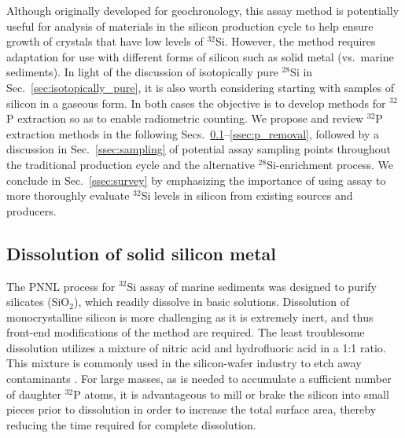 \documentclass[final,5p]{elsarticle}
\def\si{$^{32}$Si\xspace}
\def\p{$^{32}$P\xspace}
\def\esi{$^{28}$Si\xspace}
\begin{document}
Although originally developed for geochronology, this assay method is potentially useful for analysis of materials in the silicon production cycle to help ensure growth of crystals that have low levels of \si. However, the method requires adaptation for use with different forms of silicon such as solid metal (vs.\ marine sediments). In light of the discussion of isotopically pure \esi in Sec.\ \ref{sec:isotopically_pure}, it is also worth considering starting with samples of silicon in a gaseous form. In both cases the objective is to develop methods for \p extraction so as to enable radiometric counting. We propose and review \p extraction methods in the following Secs.\ \ref{ssec:solid}--\ref{ssec:p_removal}, followed by a discussion in Sec.\ \ref{ssec:sampling} of potential assay sampling points throughout the traditional production cycle and the alternative \esi-enrichment process. We conclude in Sec.\ \ref{ssec:survey} by emphasizing the importance of using assay to more thoroughly evaluate \si levels in silicon from existing sources and producers.

\subsection{Dissolution of solid silicon metal}\label{ssec:solid}
The PNNL process for \si assay of marine sediments was designed to purify silicates (SiO$_2$), which readily dissolve in basic solutions. Dissolution of monocrystalline silicon is more challenging as it is extremely inert, and thus front-end modifications of the method are required.  The least troublesome dissolution utilizes a mixture of nitric acid and hydrofluoric acid in a 1:1 ratio. This mixture is commonly used in the silicon-wafer industry  to etch away contaminants \cite{kant}. For large masses, as is needed to accumulate a sufficient number of daughter \p atoms, it is advantageous to mill or brake the silicon into small pieces prior to dissolution in order to increase the total surface area, thereby reducing the time required for complete dissolution.
\end{document}
